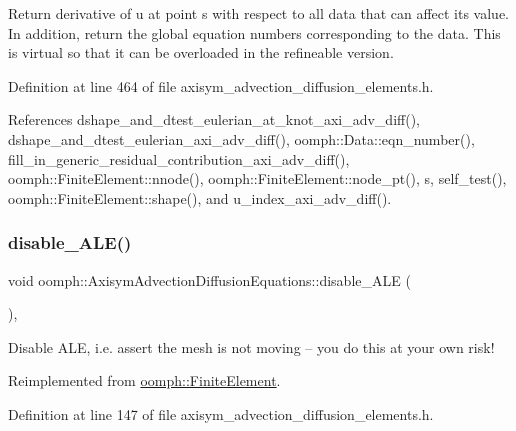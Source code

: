 Return derivative of u at point s with respect to all data that can affect its value. In addition, return the global equation numbers corresponding to the data. This is virtual so that it can be overloaded in the refineable version. 



Definition at line 464 of file axisym\+\_\+advection\+\_\+diffusion\+\_\+elements.\+h.



References dshape\+\_\+and\+\_\+dtest\+\_\+eulerian\+\_\+at\+\_\+knot\+\_\+axi\+\_\+adv\+\_\+diff(), dshape\+\_\+and\+\_\+dtest\+\_\+eulerian\+\_\+axi\+\_\+adv\+\_\+diff(), oomph\+::\+Data\+::eqn\+\_\+number(), fill\+\_\+in\+\_\+generic\+\_\+residual\+\_\+contribution\+\_\+axi\+\_\+adv\+\_\+diff(), oomph\+::\+Finite\+Element\+::nnode(), oomph\+::\+Finite\+Element\+::node\+\_\+pt(), s, self\+\_\+test(), oomph\+::\+Finite\+Element\+::shape(), and u\+\_\+index\+\_\+axi\+\_\+adv\+\_\+diff().

\mbox{\label{classoomph_1_1AxisymAdvectionDiffusionEquations_a366b53e0b3af1fc245f2d5173503a241}} 
\subsubsection{\texorpdfstring{disable\+\_\+\+A\+L\+E()}{disable\_ALE()}}
{\footnotesize\ttfamily void oomph\+::\+Axisym\+Advection\+Diffusion\+Equations\+::disable\+\_\+\+A\+LE (\begin{DoxyParamCaption}{ }\end{DoxyParamCaption})\hspace{0.3cm}{\ttfamily [inline]}, {\ttfamily [virtual]}}



Disable A\+LE, i.\+e. assert the mesh is not moving -- you do this at your own risk! 



Reimplemented from \hyperlink{classoomph_1_1FiniteElement_a625ea6d3f9baccfbdd1323315fb3ec71}{oomph\+::\+Finite\+Element}.



Definition at line 147 of file axisym\+\_\+advection\+\_\+diffusion\+\_\+elements.\+h.



